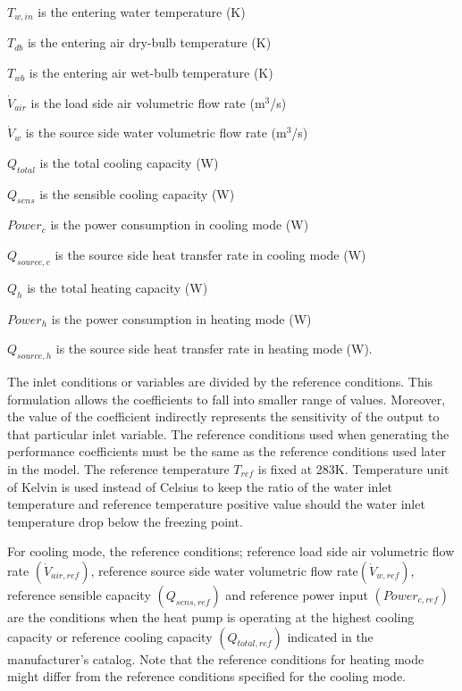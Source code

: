 \({T_{w,in}}\) is the entering water temperature (K)

\({T_{db}}\) is the entering air dry-bulb temperature (K)

\({T_{wb}}\) is the entering air wet-bulb temperature (K)

\({\dot V_{air}}\) is the load side air volumetric flow rate (m\(^{3}\)/s)

\({\dot V_w}\) is the source side water volumetric flow rate (m\(^{3}\)/s)

\({Q_{total}}\) is the total cooling capacity (W)

\({Q_{sens}}\) is the sensible cooling capacity (W)

\(Powe{r_c}\) is the power consumption in cooling mode (W)

\({Q_{source,c}}\) is the source side heat transfer rate in cooling mode (W)

\({Q_h}\) is the total heating capacity (W)

\(Powe{r_h}\) is the power consumption in heating mode (W)

\({Q_{source,h}}\) is the source side heat transfer rate in heating mode (W).

The inlet conditions or variables are divided by the reference conditions. This formulation allows the coefficients to fall into smaller range of values. Moreover, the value of the coefficient indirectly represents the sensitivity of the output to that particular inlet variable. The reference conditions used when generating the performance coefficients must be the same as the reference conditions used later in the model. The reference temperature \({T_{ref}}\) is fixed at 283K. Temperature unit of Kelvin is used instead of Celsius to keep the ratio of the water inlet temperature and reference temperature positive value should the water inlet temperature drop below the freezing point.

For cooling mode, the reference conditions; reference load side air volumetric flow rate \(\left( {{{\dot V}_{air,ref}}} \right)\), reference source side water volumetric flow rate\(\left( {{{\dot V}_{w,ref}}} \right)\), reference sensible capacity \(\left( {{Q_{sens,ref}}} \right)\) and reference power input \(\left( {Powe{r_{c,ref}}} \right)\) are the conditions when the heat pump is operating at the highest cooling capacity or reference cooling capacity \(\left( {{Q_{total,ref}}} \right)\) indicated in the manufacturer's catalog. Note that the reference conditions for heating mode might differ from the reference conditions specified for the cooling mode.

